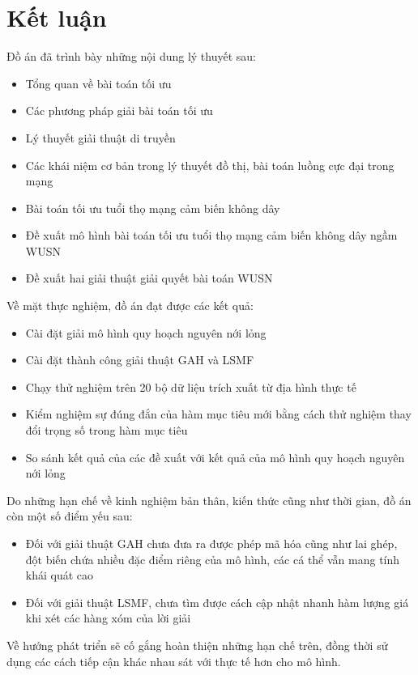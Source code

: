 \chapter*{Kết luận}
Đồ án đã trình bày những nội dung lý thuyết sau:
\begin{itemize}
    \item Tổng quan về bài toán tối ưu 
    \item Các phương pháp giải bài toán tối ưu 
    \item Lý thuyết giải thuật di truyền 
    \item Các khái niệm cơ bản trong lý thuyết đồ thị, bài toán luồng cực đại trong mạng
    \item Bài toán tối ưu tuổi thọ mạng cảm biến không dây 
    \item Đề xuất mô hình bài toán tối ưu tuổi thọ mạng cảm biến không dây ngầm WUSN
    \item Đề xuất hai giải thuật giải quyết bài toán WUSN 
\end{itemize}
Về mặt thực nghiệm, đồ án đạt được các kết quả:
\begin{itemize}
    \item Cài đặt giải mô hình quy hoạch nguyên nới lỏng 
    \item Cài đặt thành công giải thuật GAH và LSMF
    \item Chạy thử nghiệm trên 20 bộ dữ liệu trích xuất từ địa hình thực tế
    \item Kiểm nghiệm sự đúng đắn của hàm mục tiêu mới bằng cách thử nghiệm thay đổi trọng số trong hàm mục tiêu 
    \item So sánh kết quả của các đề xuất với kết quả của mô hình quy hoạch nguyên nới lỏng 
\end{itemize}

Do những hạn chế về kinh nghiệm bản thân, kiến thức cũng như  thời gian, đồ án còn một số điểm yếu sau:
\begin{itemize}
    \item Đối với giải thuật GAH chưa đưa ra được phép mã hóa cũng như lai ghép, đột biến chứa nhiều đặc điểm riêng của mô hình, các cá thể vẫn mang tính khái quát cao 
    \item Đối với giải thuật LSMF, chưa tìm được cách cập nhật nhanh hàm lượng giá khi xét các hàng xóm của lời giải
\end{itemize}

Về hướng phát triển sẽ cố gắng hoàn thiện những hạn chế trên, đồng thời sử dụng các cách tiếp cận khác nhau sát với thực tế hơn cho mô hình.